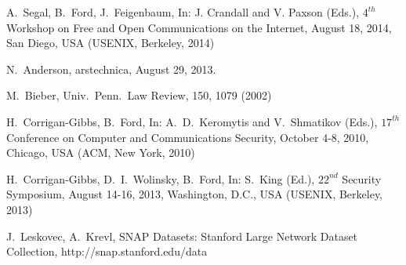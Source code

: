\documentclass[USenglish,oneside,twocolumn]{article}
\begin{document}

\begin{thebibliography}{99}
 A.~Segal, B.~Ford, J.~Feigenbaum, 
In: J. Crandall and V. Paxson (Eds.), $4^{th}$ Workshop on Free and 
Open Communications on the Internet, August 18, 2014, San Diego, 
USA (USENIX, Berkeley, 2014)

 N.~Anderson, arstechnica, August 29, 2013. 

 M.~Bieber, Univ.~Penn.~Law Review, 150, 1079 (2002)

 H.~Corrigan-Gibbs, B.~Ford, In: A.~D.~Keromytis and 
V.~Shmatikov (Eds.), $17^{th}$ Conference on Computer and Communications 
Security, October 4-8, 2010, Chicago, USA (ACM, New York, 2010)

 H.~Corrigan-Gibbs, D.~I.~Wolinsky, B.~Ford, In: 
S.~King (Ed.), $22^{nd}$ Security Symposium, August 14-16, 2013, 
Washington, D.C., USA (USENIX, Berkeley, 2013) 

 J.~Leskovec, A.~Krevl, SNAP Datasets: 
Stanford Large Network Dataset Collection, 
http://snap.stanford.edu/data


\end{thebibliography}
\end{document}
